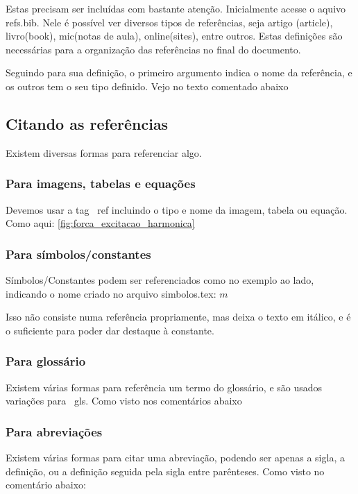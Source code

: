 Estas precisam ser incluídas com bastante atenção. Inicialmente acesse o aquivo refs.bib. Nele é possível ver diversos tipos de referências, seja artigo (article), livro(book), mic(notas de aula), online(sites), entre outros. Estas definições são necessárias para a organização das referências no final do documento.

Seguindo para sua definição, o primeiro argumento indica o nome da referência, e os outros tem o seu tipo definido. Vejo no texto comentado abaixo


\subsection{Citando as referências}
Existem diversas formas para referenciar algo.


\subsubsection{Para imagens, tabelas e equações}
Devemos usar a tag \ ref incluindo o tipo e nome da imagem, tabela ou equação. Como aqui: \ref{fig:forca_excitacao_harmonica}

\subsubsection{Para símbolos/constantes}
Símbolos/Constantes podem ser referenciados como no exemplo ao lado, indicando o nome criado no arquivo simbolos.tex: \(m\)

Isso não consiste numa referência propriamente, mas deixa o texto em itálico, e é o suficiente para poder dar destaque à constante.

\subsubsection{Para glossário}
Existem várias formas para referência um termo do glossário, e são usados variações para \ gls. Como visto nos comentários abaixo



\subsubsection{Para abreviações}
Existem várias formas para citar uma abreviação, podendo ser apenas a sigla, a definição, ou a definição seguida pela sigla entre parênteses. Como visto no comentário abaixo:

